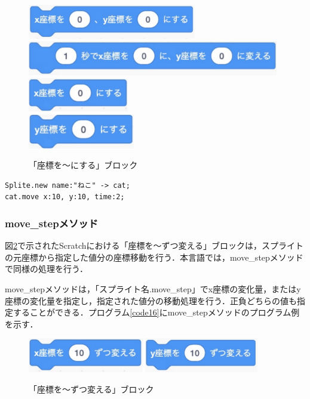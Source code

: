 \documentclass[10pt,a4j]{ltjsarticle}
\begin{document}
\begin{figure}[H]
  \centering
  \includegraphics[height=15mm]{images/move_x_y.pdf} \\
  \includegraphics[height=15mm]{images/move_x_y_time.pdf} \\
  \includegraphics[height=15mm]{images/move_x.pdf} \\
  \includegraphics[height=15mm]{images/move_y.pdf} 
  \caption{「座標を〜にする」ブロック}
  \label{fig:move}
\end{figure}

\begin{lstlisting}[caption=moveメソッドのプログラム例, label=code15]
Splite.new name:"ねこ" -> cat;
cat.move x:10, y:10, time:2; 
\end{lstlisting}

\subsubsection{move\_stepメソッド}
図\ref{fig:step}で示されたScratchにおける「座標を〜ずつ変える」ブロックは，スプライトの元座標から指定した値分の座標移動を行う．本言語では，move\_stepメソッドで同様の処理を行う．

move\_stepメソッドは，「スプライト名.move\_step」でx座標の変化量，またはy座標の変化量を指定し，指定された値分の移動処理を行う．正負どちらの値も指定することができる．プログラム\ref{code16}にmove\_stepメソッドのプログラム例を示す．

\begin{figure}[H]
  \centering
  \includegraphics[height=15mm]{images/step_x.pdf} 
  \includegraphics[height=15mm]{images/step_y.pdf} 
  \caption{「座標を〜ずつ変える」ブロック}
  \label{fig:step}
\end{figure}
\end{document}

